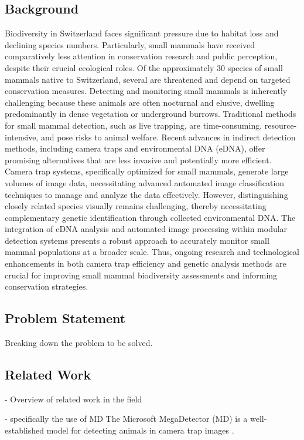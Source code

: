     \subsection{Background}
    Biodiversity in Switzerland faces significant pressure due to habitat loss and declining species numbers.
    Particularly, small mammals have received comparatively less attention in conservation research and public perception, despite their crucial ecological roles.
    Of the approximately 30 species of small mammals native to Switzerland, several are threatened and depend on targeted conservation measures.
    Detecting and monitoring small mammals is inherently challenging because these animals are often nocturnal and elusive, dwelling predominantly in dense vegetation or underground burrows.
    Traditional methods for small mammal detection, such as live trapping, are time-consuming, resource-intensive, and pose risks to animal welfare.
    Recent advances in indirect detection methods, including camera traps and environmental DNA (eDNA), offer promising alternatives that are less invasive and potentially more efficient.
    Camera trap systems, specifically optimized for small mammals, generate large volumes of image data, necessitating advanced automated image classification techniques to manage and analyze the data effectively.
    However, distinguishing closely related species visually remains challenging, thereby necessitating complementary genetic identification through collected environmental DNA.
    The integration of eDNA analysis and automated image processing within modular detection systems presents a robust approach to accurately monitor small mammal populations at a broader scale.
    Thus, ongoing research and technological enhancements in both camera trap efficiency and genetic analysis methods are crucial for improving small mammal biodiversity assessments and informing conservation strategies.

    \subsection{Problem Statement}

    Breaking down the problem to be solved.

    \subsection{Related Work}

    - Overview of related work in the field

    - specifically the use of MD
    The Microsoft MegaDetector (MD) is a well-established model for detecting animals in camera trap images \autocite{hernandezPytorchWildlifeCollaborativeDeep2024a, velezChoosingAppropriatePlatform2022, schneiderRecognitionEuropeanMammals2024}.

